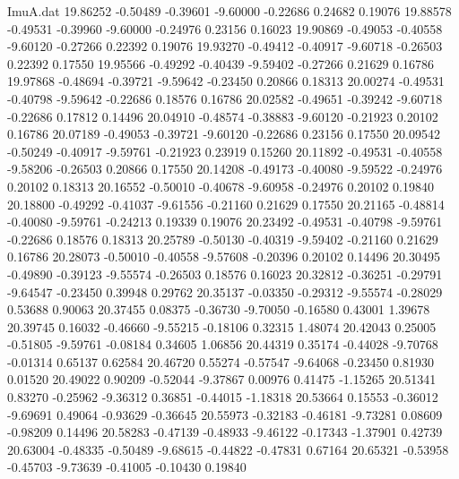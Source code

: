 \begin{filecontents}{ImuA.dat}
  19.86252   -0.50489   -0.39601   -9.60000   -0.22686    0.24682    0.19076
  19.88578   -0.49531   -0.39960   -9.60000   -0.24976    0.23156    0.16023
  19.90869   -0.49053   -0.40558   -9.60120   -0.27266    0.22392    0.19076
  19.93270   -0.49412   -0.40917   -9.60718   -0.26503    0.22392    0.17550
  19.95566   -0.49292   -0.40439   -9.59402   -0.27266    0.21629    0.16786
  19.97868   -0.48694   -0.39721   -9.59642   -0.23450    0.20866    0.18313
  20.00274   -0.49531   -0.40798   -9.59642   -0.22686    0.18576    0.16786
  20.02582   -0.49651   -0.39242   -9.60718   -0.22686    0.17812    0.14496
  20.04910   -0.48574   -0.38883   -9.60120   -0.21923    0.20102    0.16786
  20.07189   -0.49053   -0.39721   -9.60120   -0.22686    0.23156    0.17550
  20.09542   -0.50249   -0.40917   -9.59761   -0.21923    0.23919    0.15260
  20.11892   -0.49531   -0.40558   -9.58206   -0.26503    0.20866    0.17550
  20.14208   -0.49173   -0.40080   -9.59522   -0.24976    0.20102    0.18313
  20.16552   -0.50010   -0.40678   -9.60958   -0.24976    0.20102    0.19840
  20.18800   -0.49292   -0.41037   -9.61556   -0.21160    0.21629    0.17550
  20.21165   -0.48814   -0.40080   -9.59761   -0.24213    0.19339    0.19076
  20.23492   -0.49531   -0.40798   -9.59761   -0.22686    0.18576    0.18313
  20.25789   -0.50130   -0.40319   -9.59402   -0.21160    0.21629    0.16786
  20.28073   -0.50010   -0.40558   -9.57608   -0.20396    0.20102    0.14496
  20.30495   -0.49890   -0.39123   -9.55574   -0.26503    0.18576    0.16023
  20.32812   -0.36251   -0.29791   -9.64547   -0.23450    0.39948    0.29762
  20.35137   -0.03350   -0.29312   -9.55574   -0.28029    0.53688    0.90063
  20.37455    0.08375   -0.36730   -9.70050   -0.16580    0.43001    1.39678
  20.39745    0.16032   -0.46660   -9.55215   -0.18106    0.32315    1.48074
  20.42043    0.25005   -0.51805   -9.59761   -0.08184    0.34605    1.06856
  20.44319    0.35174   -0.44028   -9.70768   -0.01314    0.65137    0.62584
  20.46720    0.55274   -0.57547   -9.64068   -0.23450    0.81930    0.01520
  20.49022    0.90209   -0.52044   -9.37867    0.00976    0.41475   -1.15265
  20.51341    0.83270   -0.25962   -9.36312    0.36851   -0.44015   -1.18318
  20.53664    0.15553   -0.36012   -9.69691    0.49064   -0.93629   -0.36645
  20.55973   -0.32183   -0.46181   -9.73281    0.08609   -0.98209    0.14496
  20.58283   -0.47139   -0.48933   -9.46122   -0.17343   -1.37901    0.42739
  20.63004   -0.48335   -0.50489   -9.68615   -0.44822   -0.47831    0.67164
  20.65321   -0.53958   -0.45703   -9.73639   -0.41005   -0.10430    0.19840

\end{filecontents}
